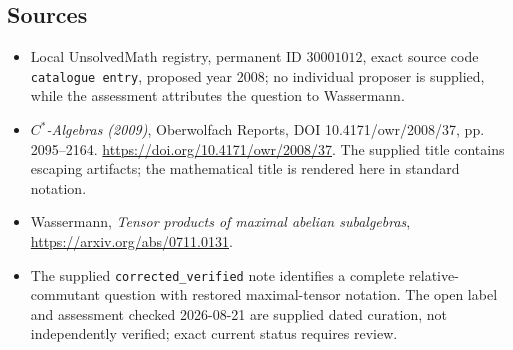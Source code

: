 \documentclass[11pt]{article}
\begin{document}
\subsection{Sources}
\begin{itemize}
\item Local UnsolvedMath registry, permanent ID \(30001012\), exact source code \texttt{catalogue entry}, proposed year 2008; no individual proposer is supplied, while the assessment attributes the question to Wassermann.
\item \emph{\(C^*\)-Algebras (2009)}, Oberwolfach Reports, DOI 10.4171/owr/2008/37, pp. 2095--2164. \url{https://doi.org/10.4171/owr/2008/37}. The supplied title contains escaping artifacts; the mathematical title is rendered here in standard notation.
\item Wassermann, \emph{Tensor products of maximal abelian subalgebras}, \url{https://arxiv.org/abs/0711.0131}.
\item The supplied \texttt{corrected\_verified} note identifies a complete relative-commutant question with restored maximal-tensor notation. The open label and assessment checked 2026-08-21 are supplied dated curation, not independently verified; exact current status requires review.
\end{itemize}
\end{document}
